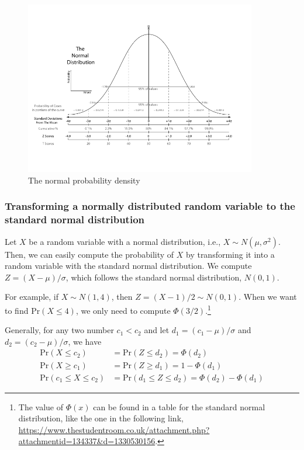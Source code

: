 \documentclass[a4paper,11pt]{article}
\begin{document}
\begin{figure}[htbp]
\centering
\includegraphics[width=0.9\textwidth]{figure/Normal-distribution-curve.png}
\caption{\label{fig:orgf15006c}
The normal probability density}
\end{figure}

\subsubsection*{Transforming a normally distributed random variable to the standard normal distribution}
\label{sec:orgc08edf6}

Let \(X\) be a random variable with a normal distribution, i.e., \(X \sim
N(\mu, \sigma^2)\). Then, we can easily compute the probability of \(X\)
by transforming it into a random variable with the standard normal
distribution. We compute \(Z = (X-\mu)/\sigma\), which follows
the standard normal distribution, \(N(0, 1)\).

For example, if \(X \sim N(1, 4)\), then \(Z = (X-1)/2 \sim N(0,
1)\). When we want to find \(\mathrm{Pr}(X \leq 4)\), we only need to
compute \(\Phi(3/2)\).\footnote{The value of \(\Phi(x)\) can be found in a table for the standard
normal distribution, like the one in the following link,
\url{https://www.thestudentroom.co.uk/attachment.php?attachmentid=134337\&d=1330530156}.}

Generally, for any two number \(c_1 < c_2\) and let \(d_1 = (c_1 - \mu)/\sigma\) and
\(d_2 = (c_2 - \mu)/\sigma\), we have
\begin{align*}
\mathrm{Pr}(X \leq c_2) & = \mathrm{Pr}(Z \leq d_2) = \Phi(d_2) \\
\mathrm{Pr}(X \geq c_1) & = \mathrm{Pr}(Z \geq d_1) = 1 - \Phi(d_1) \\
\mathrm{Pr}(c_1 \leq X \leq c_2) & = \mathrm{Pr}(d_1 \leq Z \leq d_2) = \Phi(d_2) - \Phi(d_1)
\end{align*}
\end{document}
